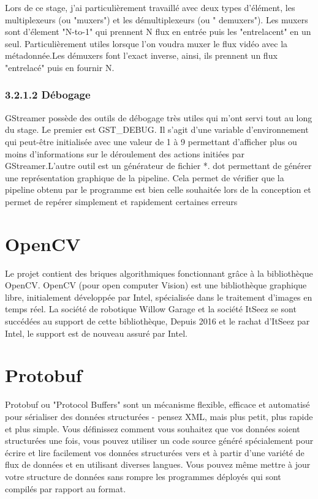 Lors de ce stage, j'ai particulièrement travaillé avec deux types d'élément, les multiplexeurs (ou "muxers") et les démultiplexeurs (ou " demuxers"). Les muxers sont d'élement "N-to-1" qui prennent N flux en entrée puis les "entrelacent" en un seul. Particulièrement utiles lorsque l'on voudra muxer le flux vidéo avec la métadonnée.Les démuxers font l'exact inverse, ainsi, ils prennent un flux "entrelacé" puis en fournir N.


\subsubsection{3.2.1.2 Débogage}
GStreamer possède des outils de débogage très utiles qui m'ont servi tout au long du stage. Le premier est GST\_DEBUG. Il s'agit d'une variable d’environnement qui peut-être initialisée avec une valeur de 1 à 9 permettant d'afficher plus ou moins d'informations sur le déroulement des actions initiées par GStreamer.L'autre outil est un générateur de fichier *. dot permettant de générer une représentation graphique de la pipeline. Cela permet de vérifier que la pipeline obtenu par le programme est bien celle souhaitée lors de la conception et permet de repérer simplement et rapidement certaines erreurs


\section{OpenCV}
Le projet contient des briques algorithmiques fonctionnant grâce à la bibliothèque OpenCV. OpenCV (pour open computer Vision) est une bibliothèque graphique libre, initialement développée par Intel, spécialisée dans le traitement d'images en temps réel. La société de robotique Willow Garage et la société ItSeez se sont succédées au support de cette bibliothèque, Depuis 2016 et le rachat d'ItSeez par Intel, le support est de nouveau assuré par Intel.


\section{Protobuf }
Protobuf ou "Protocol Buffers" sont un mécanisme flexible, efficace et automatisé pour sérialiser des données structurées - pensez XML, mais plus petit, plus rapide et plus simple. Vous définissez comment vous souhaitez que vos données soient structurées une fois, vous pouvez utiliser un code source généré spécialement pour écrire et lire facilement vos données structurées vers et à partir d'une variété de flux de données et en utilisant diverses langues. Vous pouvez même mettre à jour votre structure de données sans rompre les programmes déployés qui sont compilés par rapport au format.

